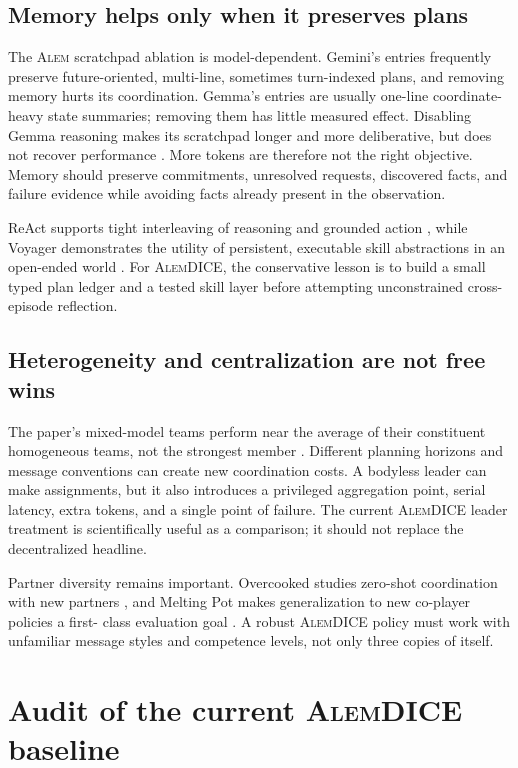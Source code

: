 \documentclass[11pt]{article}
\newcommand{\alem}{\textsc{Alem}}
\newcommand{\dice}{\textsc{AlemDICE}}
\begin{document}
\subsection{Memory helps only when it preserves plans}

The \alem{} scratchpad ablation is model-dependent.  Gemini's entries frequently preserve
future-oriented, multi-line, sometimes turn-indexed plans, and removing memory hurts its
coordination.  Gemma's entries are usually one-line coordinate-heavy state summaries; removing
them has little measured effect.  Disabling Gemma reasoning makes its scratchpad longer and more
deliberative, but does not recover performance \cite{alem2026}.  More tokens are therefore not the
right objective.  Memory should preserve commitments, unresolved requests, discovered facts, and
failure evidence while avoiding facts already present in the observation.

ReAct supports tight interleaving of reasoning and grounded action \cite{yao2023react}, while
Voyager demonstrates the utility of persistent, executable skill abstractions in an open-ended world
\cite{wang2024voyager}.  For \dice{}, the conservative lesson is to build a small typed plan ledger
and a tested skill layer before attempting unconstrained cross-episode reflection.

\subsection{Heterogeneity and centralization are not free wins}

The paper's mixed-model teams perform near the average of their constituent homogeneous teams,
not the strongest member \cite{alem2026}.  Different planning horizons and message conventions can
create new coordination costs.  A bodyless leader can make assignments, but it also introduces a
privileged aggregation point, serial latency, extra tokens, and a single point of failure.  The current
\dice{} leader treatment is scientifically useful as a comparison; it should not replace the
decentralized headline.

Partner diversity remains important.  Overcooked studies zero-shot coordination with new partners
\cite{carroll2019overcooked}, and Melting Pot makes generalization to new co-player policies a first-
class evaluation goal \cite{leibo2021meltingpot}.  A robust \dice{} policy must work with unfamiliar
message styles and competence levels, not only three copies of itself.

\section{Audit of the current \dice{} baseline}
\end{document}
